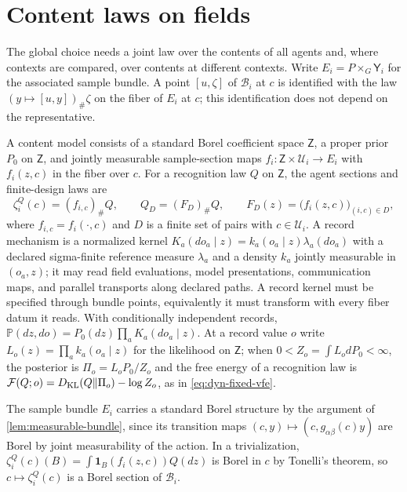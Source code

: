 \section{Content laws on fields}
\label{sec:content-laws}

The global choice needs a joint law over the contents of all agents and, where contexts are compared, over contents at different contexts. Write $E_i=P\times_G\mathsf Y_i$ for the associated sample bundle. A point $[u,\zeta]$ of $\mathcal B_i$ at $c$ is identified with the law $(y\mapsto[u,y])_\#\zeta$ on the fiber of $E_i$ at $c$; this identification does not depend on the representative.

A content model consists of a standard Borel coefficient space $\mathsf Z$, a proper prior $P_0$ on $\mathsf Z$, and jointly measurable sample-section maps $f_i:\mathsf Z\times\mathcal U_i\to E_i$ with $f_i(z,c)$ in the fiber over $c$. For a recognition law $Q$ on $\mathsf Z$, the agent sections and finite-design laws are
\begin{equation}
 \zeta_i^Q(c)=(f_{i,c})_\#Q,\qquad
 Q_D=(F_D)_\#Q,\qquad
 F_D(z)=\bigl(f_i(z,c)\bigr)_{(i,c)\in D},
 \label{eq:content-law}
\end{equation}
where $f_{i,c}=f_i(\cdot,c)$ and $D$ is a finite set of pairs with $c\in\mathcal U_i$. A record mechanism is a normalized kernel $K_a(do_a\mid z)=k_a(o_a\mid z)\lambda_a(do_a)$ with a declared sigma-finite reference measure $\lambda_a$ and a density $k_a$ jointly measurable in $(o_a,z)$; it may read field evaluations, model presentations, communication maps, and parallel transports along declared paths. A record kernel must be specified through bundle points, equivalently it must transform with every fiber datum it reads. With conditionally independent records, $\mathbb P(dz,do)=P_0(dz)\prod_aK_a(do_a\mid z)$. At a record value $o$ write $L_o(z)=\prod_ak_a(o_a\mid z)$ for the likelihood on $\mathsf Z$; when $0<Z_o=\int L_odP_0<\infty$, the posterior is $\Pi_o=L_oP_0/Z_o$ and the free energy of a recognition law is $\mathcal F(Q;o)=D_{\mathrm{KL}}(Q\Vert\Pi_o)-\log Z_o$, as in \cref{eq:dyn-fixed-vfe}.

The sample bundle $E_i$ carries a standard Borel structure by the argument of \cref{lem:measurable-bundle}, since its transition maps $(c,y)\mapsto(c,g_{\alpha\beta}(c)y)$ are Borel by joint measurability of the action. In a trivialization, $\zeta_i^Q(c)(B)=\int\mathbf 1_B(f_i(z,c))Q(dz)$ is Borel in $c$ by Tonelli's theorem, so $c\mapsto\zeta_i^Q(c)$ is a Borel section of $\mathcal B_i$.

